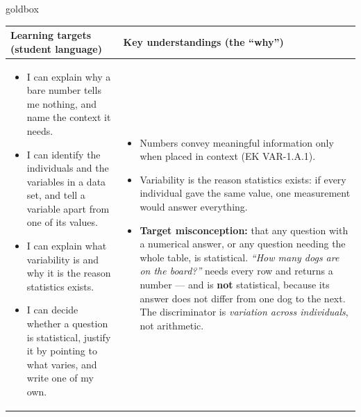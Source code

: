 \documentclass[10pt]{article}
\begin{document}
\renewcommand{\arraystretch}{1.4}
\boxguard
\begin{skillbox}{goldbox}
\begin{tabularx}{\linewidth}{@{}X|X@{}}
\textbf{Learning targets (student language)} & \textbf{Key understandings (the ``why'')} \\[2pt]
\hline
\vspace{-6pt}
\begin{itemize}[leftmargin=1.1em, nosep, after=\vspace{2pt}]
  \item I can explain why a bare number tells me nothing, and name the context it needs.
  \item I can identify the individuals and the variables in a data set, and tell a variable
        apart from one of its values.
  \item I can explain what variability is and why it is the reason statistics exists.
  \item I can decide whether a question is statistical, justify it by pointing to what varies,
        and write one of my own.
\end{itemize}
&
\vspace{-6pt}
\begin{itemize}[leftmargin=1.1em, nosep, after=\vspace{2pt}]
  \item Numbers convey meaningful information only when placed in context (EK VAR-1.A.1).
  \item Variability is the reason statistics exists: if every individual gave the same value,
        one measurement would answer everything.
  \item \textbf{Target misconception:} that any question with a numerical answer, or any
        question needing the whole table, is statistical. \emph{``How many dogs are on the
        board?''} needs every row and returns a number --- and is \textbf{not} statistical,
        because its answer does not differ from one dog to the next. The discriminator is
        \emph{variation across individuals}, not arithmetic.
\end{itemize}
\end{tabularx}
\end{skillbox}
\end{document}
